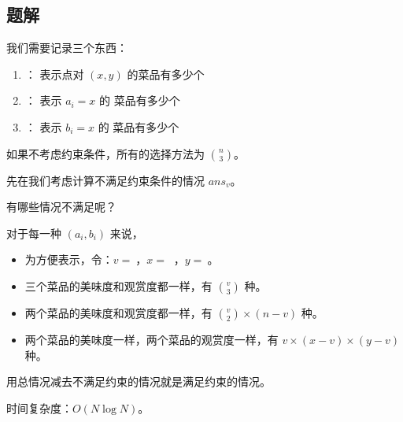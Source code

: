 \subsection{题解}


\begin{frame} %
我们需要记录三个东西：

\begin{enumerate}
    \item {}： 表示点对 $(x,
        y)$ 的菜品有多少个
    \item {}： 表示 $a_i = x$ 的 菜品有多少个
    \item {}： 表示 $b_i = x$ 的 菜品有多少个
\end{enumerate}
\end{frame}


\begin{frame} %

如果不考虑约束条件，所有的选择方法为 ${n \choose 3}$。

先在我们考虑计算不满足约束条件的情况 $ans_v$。

有哪些情况不满足呢？

对于每一种 $(a_i, b_i)$ 来说，
\begin{itemize}
    \item 为方便表示，令：$v =\ $，$x =\ $
        ，$y =\ $。
	\item 三个菜品的美味度和观赏度都一样，有 ${v \choose 3}$ 种。
	\item 两个菜品的美味度和观赏度都一样，有 ${v \choose 2} \times (n - v)$ 种。
	\item 两个菜品的美味度一样，两个菜品的观赏度一样，有 ${v\times (x - v)\times
        (y - v)}$ 种。
\end{itemize}

用总情况减去不满足约束的情况就是满足约束的情况。

时间复杂度：$O(N\log N)$。
\end{frame}


